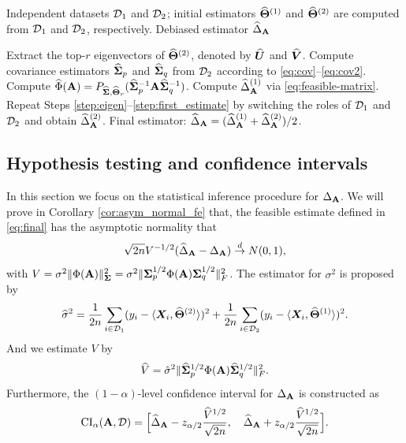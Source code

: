 \documentclass[authoryear,preprint,review,12pt]{elsarticle}
\begin{document}
	\begin{algorithm}
		\caption{Feasible Projection-base One Step Estimate}
		\label{alg:debias}
		\begin{algorithmic}[1]
			\Require Independent datasets $\mathcal{D}_1$ and $\mathcal{D}_2$; initial estimators $\widehat{\mathbf{\Theta}}^{(1)}$ and $\widehat{\mathbf{\Theta}}^{(2)}$ are computed from $\mathcal{D}_1$ and $\mathcal{D}_2$, respectively.
			\Ensure Debiased estimator $\widehat\Delta_{\mathbf{A}}$
			
			\State Extract the top-$r$ eigenvectors of $\widehat{\mathbf{\Theta}}^{(2)}$, denoted by $\widehat{\boldsymbol U}$ and $\widehat{\boldsymbol V}$. \label{step:eigen}
			\State Compute covariance estimators $\widehat{\mathbf{ \Sigma}}_p$ and $\widehat{\mathbf{ \Sigma}}_q$ from $\mathcal{D}_2$ according to \eqref{eq:cov}--\eqref{eq:cov2}.
			\State Compute  $\widehat\Phi(\mathbf{A}) =    P_{\widehat{\mathbf{ \Sigma}},\widehat{\mathbf{\Theta}}_r}(\widehat{\mathbf{ \Sigma}}_p^{-1}\mathbf{A} \widehat{\mathbf{ \Sigma}}_q^{-1})$. 
			\State Compute $\widehat\Delta_{\mathbf{A}}^{(1)}$ via \eqref{eq:feasible-matrix}. \label{step:first_estimate}
			\State Repeat Steps \ref{step:eigen}–\ref{step:first_estimate} by switching the roles of $\mathcal{D}_1$ and $\mathcal{D}_2$ and obtain $\widehat\Delta_{\mathbf{A}}^{(2)}$.
			\State \Return Final estimator: $\widehat\Delta_{\mathbf{A}} =  (\widehat\Delta_{\mathbf{A}}^{(1)} + \widehat\Delta_{\mathbf{A}}^{(2)})/2$.
		\end{algorithmic}
	\end{algorithm}
	
	\subsection{Hypothesis testing and confidence intervals}
	\label{sec:matrix_inf}
	In this section we focus  on the statistical inference procedure for $\Delta_{\mathbf{A}}$. We will prove in  Corollary \ref{cor:asym_normal_fe} that, the feasible estimate defined in  \eqref{eq:final} has the asymptotic normality that
	$$\sqrt{2n}V^{-1/2}(\widehat\Delta_{\mathbf{A}} -\Delta_{\mathbf{A}} )\stackrel{d}{\rightarrow} N(0,1),$$
	with $V = \sigma^2 \|\Phi(\mathbf{A})\|_{\mathbf{ \Sigma}}^2 = \sigma^2 \|\mathbf{ \Sigma}_p^{1/2}\Phi(\mathbf{A})\mathbf{ \Sigma}_q^{1/2}\|_F^2$. 
	The estimator for $\sigma^2$ is proposed by
	\begin{equation}
		\widehat\sigma^2 = \frac{1}{2n}\sum_{i \in \mathcal{D}_1}(y_i  - \langle\boldsymbol X_i, \widehat{\mathbf{\Theta}}^{(2)}\rangle)^2 +  \frac{1}{2n}\sum_{i \in \mathcal{D}_2}(y_i  - \langle\boldsymbol X_i, \widehat{\mathbf{\Theta}}^{(1)}\rangle)^2.
		\label{eq:matrix_vhat}
	\end{equation}
	And we estimate $V$ by
	\begin{equation}
		\widehat V = \hat\sigma^2 \|\widehat{\mathbf{ \Sigma}}_p^{1/2} \Phi(\mathbf{A})\widehat{\mathbf{ \Sigma}}_q^{1/2}\|_F^2.
		\label{eq:matrix_v}
	\end{equation}
	Furthermore, the $(1-\alpha)$-level confidence interval for $\Delta_{\mathbf{A}}$ is constructed as
	$$\text{CI}_{\alpha}(\mathbf{A}, \mathcal{D}) = \Big[\widehat\Delta_{\mathbf{A}} - z_{\alpha/2}\frac{ \widehat V^{1/2}}{\sqrt{2n}},\quad \widehat\Delta_{\mathbf{A}} + z_{\alpha/2}\frac{ \widehat V^{1/2}}{\sqrt{2n}}\Big].$$
	
\end{document}
